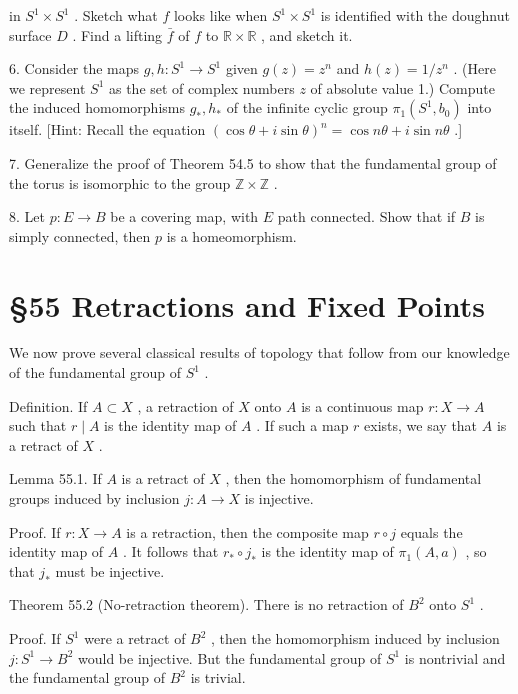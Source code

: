 \documentclass[10pt]{article}
\begin{document}
in \({S}^{1} \times  {S}^{1}\) . Sketch what \(f\) looks like when \({S}^{1} \times  {S}^{1}\) is identified with the doughnut surface \(D\) . Find a lifting \(\bar{f}\) of \(f\) to \(\mathbb{R} \times  \mathbb{R}\) , and sketch it.

6. Consider the maps \(g,h : {S}^{1} \rightarrow  {S}^{1}\) given \(g\left( z\right)  = {z}^{n}\) and \(h\left( z\right)  = 1/{z}^{n}\) . (Here we represent \({S}^{1}\) as the set of complex numbers \(z\) of absolute value 1.) Compute the induced homomorphisms \({g}_{ * },{h}_{ * }\) of the infinite cyclic group \({\pi }_{1}\left( {{S}^{1},{b}_{0}}\right)\) into itself. [Hint: Recall the equation \({\left( \cos \theta  + i\sin \theta \right) }^{n} = \cos {n\theta } + i\sin {n\theta }\) .]

7. Generalize the proof of Theorem 54.5 to show that the fundamental group of the torus is isomorphic to the group \(\mathbb{Z} \times  \mathbb{Z}\) .

8. Let \(p : E \rightarrow  B\) be a covering map, with \(E\) path connected. Show that if \(B\) is simply connected, then \(p\) is a homeomorphism.

\section*{§55 Retractions and Fixed Points}

We now prove several classical results of topology that follow from our knowledge of the fundamental group of \({S}^{1}\) .

Definition. If \(A \subset  X\) , a retraction of \(X\) onto \(A\) is a continuous map \(r : X \rightarrow  A\) such that \(r \mid  A\) is the identity map of \(A\) . If such a map \(r\) exists, we say that \(A\) is a retract of \(X\) .

Lemma 55.1. If \(A\) is a retract of \(X\) , then the homomorphism of fundamental groups induced by inclusion \(j : A \rightarrow  X\) is injective.

Proof. If \(r : X \rightarrow  A\) is a retraction, then the composite map \(r \circ  j\) equals the identity map of \(A\) . It follows that \({r}_{ * } \circ  {j}_{ * }\) is the identity map of \({\pi }_{1}\left( {A,a}\right)\) , so that \({j}_{ * }\) must be injective.

Theorem 55.2 (No-retraction theorem). There is no retraction of \({B}^{2}\) onto \({S}^{1}\) .

Proof. If \({S}^{1}\) were a retract of \({B}^{2}\) , then the homomorphism induced by inclusion \(j : {S}^{1} \rightarrow  {B}^{2}\) would be injective. But the fundamental group of \({S}^{1}\) is nontrivial and the fundamental group of \({B}^{2}\) is trivial.
\end{document}
